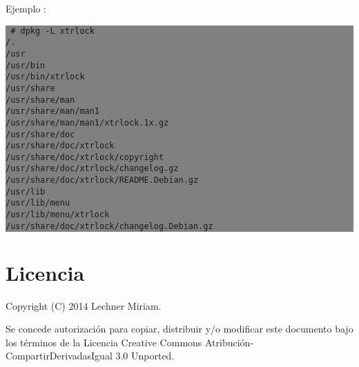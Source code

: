 \documentclass[12pt]{article}
\begin{document}
Ejemplo :

\colorbox{grey}{\parbox[t]{0.95\linewidth}{ \vspace*{0.5cm} {\tt
\# dpkg -L xtrlock \\
/. \\
/usr \\
/usr/bin \\
/usr/bin/xtrlock \\
/usr/share \\
/usr/share/man \\
/usr/share/man/man1 \\
/usr/share/man/man1/xtrlock.1x.gz \\
/usr/share/doc \\
/usr/share/doc/xtrlock \\
/usr/share/doc/xtrlock/copyright \\
/usr/share/doc/xtrlock/changelog.gz \\
/usr/share/doc/xtrlock/README.Debian.gz \\
/usr/lib \\
/usr/lib/menu \\
/usr/lib/menu/xtrlock \\
/usr/share/doc/xtrlock/changelog.Debian.gz \\
 } \vspace*{0.5cm} } } 



\section*{Licencia}
Copyright (C) 2014 Lechner Miriam.

Se concede autorización para copiar, distribuir y/o modificar este documento
bajo los términos de la Licencia Creative Commons Atribución-CompartirDerivadasIgual 3.0 Unported. 
\end{document}

